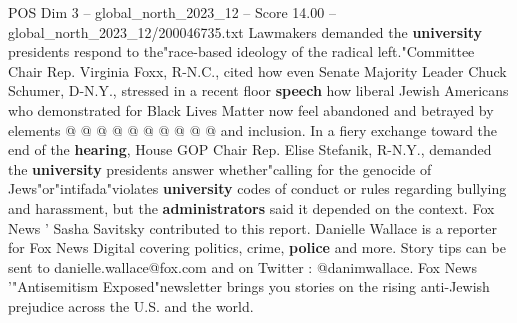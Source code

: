 \begin{textsample}{POS Dim 3 – global\_north\_2023\_12 – Score 14.00 – global\_north\_2023\_12/200046735.txt}
Lawmakers demanded the \textbf{university} presidents respond to the"race-based ideology of the radical left."Committee Chair Rep.
Virginia Foxx, R-N.C., cited how even Senate Majority Leader Chuck Schumer, D-N.Y., stressed in a recent floor \textbf{speech} how liberal Jewish Americans who demonstrated for Black Lives Matter now feel abandoned and betrayed by elements @ @ @ @ @ @ @ @ @ @ and inclusion.
In a fiery exchange toward the end of the \textbf{hearing}, House GOP Chair Rep.
Elise Stefanik, R-N.Y., demanded the \textbf{university} presidents answer whether"calling for the genocide of Jews"or"intifada"violates \textbf{university} codes of conduct or rules regarding bullying and harassment, but the \textbf{administrators} said it depended on the context.
Fox News ' Sasha Savitsky contributed to this report.
Danielle Wallace is a reporter for Fox News Digital covering politics, crime, \textbf{police} and more.
Story tips can be sent to danielle.wallace@fox.com and on Twitter : @danimwallace.
Fox News '"Antisemitism Exposed"newsletter brings you stories on the rising anti-Jewish prejudice across the U.S. and the world.

\end{textsample}
